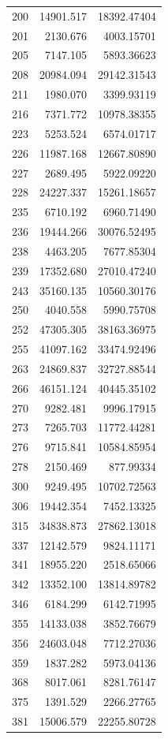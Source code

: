 \documentclass[
  12pt,
]{article}
\begin{document}
\begin{longtable}[]{@{}lrr@{}}
200 & 14901.517 & 18392.47404 \\
201 & 2130.676 & 4003.15701 \\
205 & 7147.105 & 5893.36623 \\
208 & 20984.094 & 29142.31543 \\
211 & 1980.070 & 3399.93119 \\
216 & 7371.772 & 10978.38355 \\
223 & 5253.524 & 6574.01717 \\
226 & 11987.168 & 12667.80890 \\
227 & 2689.495 & 5922.09220 \\
228 & 24227.337 & 15261.18657 \\
235 & 6710.192 & 6960.71490 \\
236 & 19444.266 & 30076.52495 \\
238 & 4463.205 & 7677.85304 \\
239 & 17352.680 & 27010.47240 \\
243 & 35160.135 & 10560.30176 \\
250 & 4040.558 & 5990.75708 \\
252 & 47305.305 & 38163.36975 \\
255 & 41097.162 & 33474.92496 \\
263 & 24869.837 & 32727.88544 \\
266 & 46151.124 & 40445.35102 \\
270 & 9282.481 & 9996.17915 \\
273 & 7265.703 & 11772.44281 \\
276 & 9715.841 & 10584.85954 \\
278 & 2150.469 & 877.99334 \\
300 & 9249.495 & 10702.72563 \\
306 & 19442.354 & 7452.13325 \\
315 & 34838.873 & 27862.13018 \\
337 & 12142.579 & 9824.11171 \\
341 & 18955.220 & 2518.65066 \\
342 & 13352.100 & 13814.89782 \\
346 & 6184.299 & 6142.71995 \\
355 & 14133.038 & 3852.76679 \\
356 & 24603.048 & 7712.27036 \\
359 & 1837.282 & 5973.04136 \\
368 & 8017.061 & 8281.76147 \\
375 & 1391.529 & 2266.27765 \\
381 & 15006.579 & 22255.80728 \\

\end{longtable}
\end{document}
